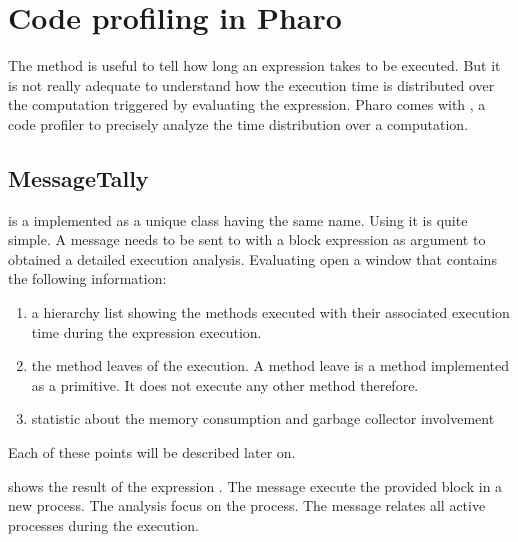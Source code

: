 \documentclass[a4paper,10pt,twoside]{book}
\begin{document}
\section{Code profiling in Pharo} 

The  method is useful to tell how long an expression takes to be executed. But it is not really adequate to understand how the execution time is distributed over the computation triggered by evaluating the expression. Pharo comes with , a code profiler to precisely analyze the time distribution over a computation. 


\subsection{MessageTally}
 is a implemented as a unique class having the same name. Using it is quite simple. A message  needs to be sent to  with a block expression as argument to obtained a detailed execution analysis. Evaluating  open a window that contains the following information:

\begin{enumerate}
\item a hierarchy list showing the methods executed with their associated execution time during the expression execution.

\item the method leaves of the execution. A method leave is a method implemented as a primitive. It does not execute any other method therefore.

\item statistic about the memory consumption and garbage collector involvement 

\end{enumerate}
Each of these points will be described later on.

 shows the result of the expression .
The message  execute the provided block in a new process. The analysis focus on the process. The message  relates all active processes during the execution. 

\end{document}

